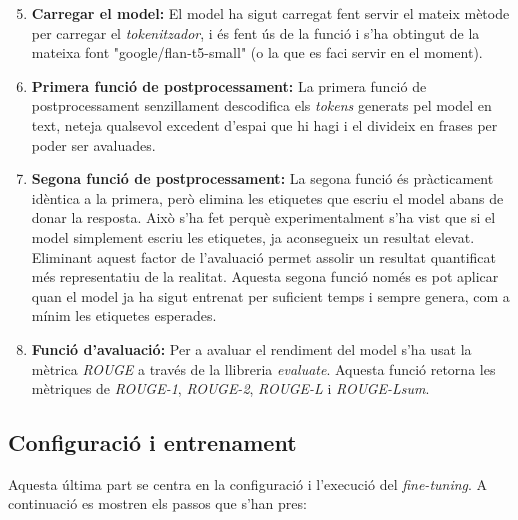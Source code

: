 \begin{enumerate}
    \setcounter{enumi}{4}
    \item \textbf{Carregar el model:} El model ha sigut carregat fent servir el mateix mètode per carregar el \textit{tokenitzador}, i és fent ús de la funció  i s'ha obtingut de la mateixa font "google/flan-t5-small" (o la que es faci servir en el moment).
    \item \textbf{Primera funció de postprocessament:} La primera funció de postprocessament senzillament descodifica els \textit{tokens} generats pel model en text, neteja qualsevol excedent d'espai que hi hagi i el divideix en frases per poder ser avaluades.
    \item \textbf{Segona funció de postprocessament:} La segona funció és pràcticament idèntica a la primera, però elimina les etiquetes que escriu el model abans de donar la resposta. Això s'ha fet perquè experimentalment s'ha vist que si el model simplement escriu les etiquetes, ja aconsegueix un resultat elevat. Eliminant aquest factor de l'avaluació permet assolir un resultat quantificat més representatiu de la realitat. Aquesta segona funció només es pot aplicar quan el model ja ha sigut entrenat per suficient temps i sempre genera, com a mínim les etiquetes esperades.
    \item \textbf{Funció d'avaluació:} Per a avaluar el rendiment del model s'ha usat la mètrica \textit{ROUGE} a través de la llibreria \textit{evaluate}. Aquesta funció retorna les mètriques de \textit{ROUGE-1}, \textit{ROUGE-2}, \textit{ROUGE-L} i \textit{ROUGE-Lsum}.
\end{enumerate}


\subsection{Configuració i entrenament}
Aquesta última part se centra en la configuració i l'execució del \textit{fine-tuning}. A continuació es mostren els passos que s'han pres:

